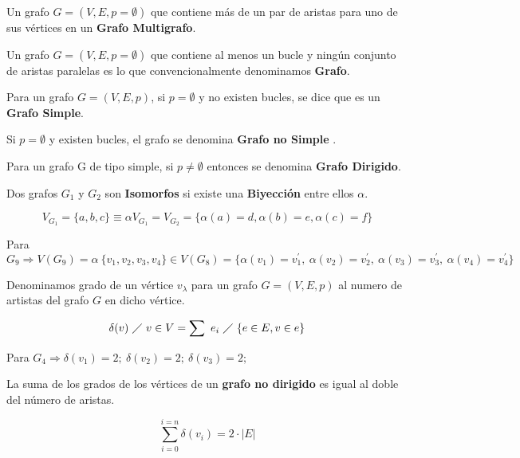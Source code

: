  Un grafo $G = (V,E,p=\emptyset)$ que contiene más de un par de aristas para uno de 
sus vértices en un \textbf{Grafo Multigrafo}.

 Un grafo $G = (V,E,p=\emptyset)$ que contiene al menos un bucle y ningún conjunto de 
aristas paralelas es lo que convencionalmente denominamos \textbf{Grafo}.


 Para un grafo $G = (V,E,p)$, si $p = \emptyset$ y no existen bucles, se 
dice que es 
un \textbf{Grafo Simple}.

{\cor Si $p = \emptyset$ y existen bucles, el grafo se denomina \textbf{Grafo no Simple} .}

 Para un grafo G de tipo simple, si $p\neq \emptyset$ entonces se denomina 
\textbf{Grafo Dirigido}.



 Dos grafos $G_1$ y $G_2$ son \textbf{Isomorfos} si existe una 
\textbf{Biyección} entre ellos 
$\alpha$.

\begin{equation}
V_{G_1} = \{a,b,c\} \equiv \alpha V_{G_1} = V_{G_2} = \{\alpha(a)= d,\alpha(b)= 
e,\alpha(c)= f\}
\end{equation}

\ejem Para $G_9 \Rightarrow V(G_9) = \alpha\ \{v_1, v_2, v_3, v_4\} \in V(G_8)  = \{\alpha(v_1) = v_1^\prime,\ \alpha (v_2) = v_2^\prime,\ \alpha (v_3) = v_3^\prime,\ \alpha (v_4) = v_4^\prime\}$



 Denominamos grado de un vértice $v_\lambda$ para un grafo $G = (V,E,p)$ 
al 
numero de artistas del grafo $G$ en dicho vértice.

\begin{equation}
\delta(v)\ \diagup\ v \in V = \sum\ e_i\ \diagup\ \{e \in E, v \in e\}
\end{equation}

\ejem Para $G_4 \Rightarrow \delta(v_1) = 2;\ \delta(v_2) = 2;\ \delta(v_3) = 
2;$

{\thm La suma de los grados de los vértices de un \textbf{grafo no dirigido} es 
igual al doble del 
número de aristas.}

\begin{equation}
\sum\limits_{i = 0}^{i= n} \delta(v_i) = 2 \cdot |E|
\end{equation}


